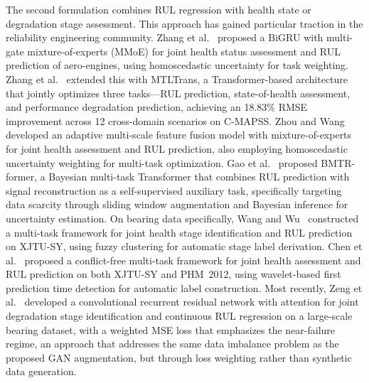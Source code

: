 \documentclass[review]{elsarticle}
\begin{document}
The second formulation combines RUL regression with health state or
degradation stage assessment. This approach has gained particular
traction in the reliability engineering community.
Zhang et al.~\cite{zhang_health_2022} proposed a BiGRU with
multi-gate mixture-of-experts (MMoE) for joint health status
assessment and RUL prediction of aero-engines, using homoscedastic
uncertainty for task weighting.
Zhang et al.~\cite{zhang_multi-task_2023} extended this with
MTLTrans, a Transformer-based architecture that jointly optimizes
three tasks---RUL prediction, state-of-health assessment, and
performance degradation prediction, achieving an 18.83\% RMSE
improvement across 12 cross-domain scenarios on C-MAPSS.
Zhou and Wang~\cite{zhou_adaptive_2024} developed an adaptive
multi-scale feature fusion model with mixture-of-experts for joint
health assessment and RUL prediction, also employing homoscedastic
uncertainty weighting for multi-task optimization.
Gao et al.~\cite{gao_bmtr-former_2026} proposed BMTR-former, a
Bayesian multi-task Transformer that combines RUL prediction with
signal reconstruction as a self-supervised auxiliary task,
specifically targeting data scarcity through sliding window
augmentation and Bayesian inference for uncertainty estimation.
On bearing data specifically,
Wang and Wu~\cite{10295667} constructed a multi-task framework for
joint health stage identification and RUL prediction on XJTU-SY,
using fuzzy clustering for automatic stage label derivation.
Chen et al.~\cite{11363290} proposed a conflict-free multi-task
framework for joint health assessment and RUL prediction on both
XJTU-SY and PHM~2012, using wavelet-based first prediction time
detection for automatic label construction. Most recently,
Zeng et al.~\cite{11451867} developed a convolutional recurrent
residual network with attention for joint degradation stage
identification and continuous RUL regression on a large-scale
bearing dataset, with a weighted MSE loss that emphasizes the
near-failure regime, an approach that addresses the same
data imbalance problem as the proposed GAN augmentation, but
through loss weighting rather than synthetic data generation.\\
\end{document}
